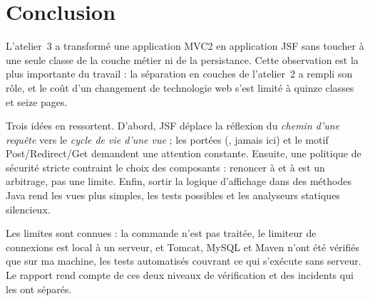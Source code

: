 \chapter{Conclusion}\label{chap:conclusion}

L'atelier~3 a transformé une application MVC2 en application JSF sans toucher à une seule classe de la couche métier ni de la
persistance. Cette observation est la plus importante du travail : la séparation en couches de l'atelier~2 a rempli
son rôle, et le coût d'un changement de technologie web s'est limité à quinze classes et seize pages.

Trois idées en ressortent. D'abord, JSF déplace la réflexion du \textit{chemin d'une requête} vers le \textit{cycle de vie d'une vue} ; les
portées (, jamais  ici) et le motif Post/Redirect/Get demandent une attention
constante. Ensuite, une politique de sécurité stricte contraint le choix des composants : renoncer à
 et à  est un arbitrage, pas une limite. Enfin, sortir la logique d'affichage dans des
méthodes Java rend les vues plus simples, les tests possibles et les analyseurs statiques silencieux.

Les limites sont connues : la commande n'est pas traitée, le limiteur de connexions est local à un serveur, et
Tomcat, MySQL et Maven n'ont été vérifiés que sur ma machine, les tests automatisés couvrant ce qui s'exécute sans serveur. Le rapport
rend compte de ces deux niveaux de vérification et des incidents qui les ont séparés.
